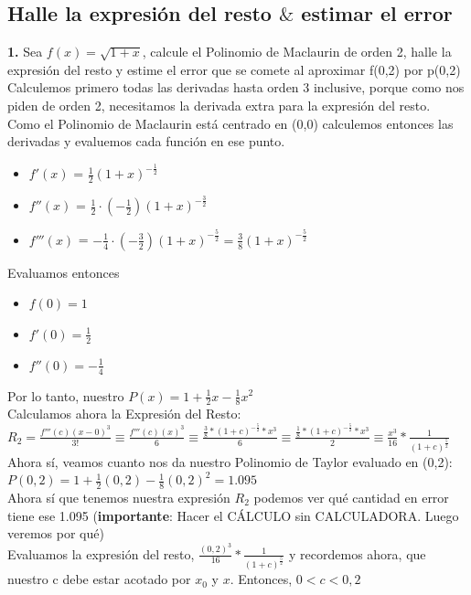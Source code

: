 \documentclass[10pt,a4paper]{article}
\begin{document}
\subsection*{Halle la expresión del resto $\&$ estimar el error}
\label{subsec:error_polinomio_taylor_2}
\textbf{1.} Sea $f(x) = \sqrt{1+x}$, calcule el Polinomio de Maclaurin de orden 2, halle la expresión del resto y estime el error que se comete al aproximar f(0,2) por p(0,2) \\
Calculemos primero todas las derivadas hasta orden 3 inclusive, porque como nos piden de orden 2, necesitamos la derivada extra para la expresión del resto. \\
Como el Polinomio de Maclaurin está centrado en (0,0) calculemos entonces las derivadas y evaluemos cada función en ese punto.
\begin{itemize}
    \item $f'(x)$ = $\frac{1}{2}(1+x)^{-\frac{1}{2}}$
    \item $f''(x)$ = $\frac{1}{2} \cdot \left(-\frac{1}{2}\right)(1+x)^{-\frac{3}{2}}$
    \item $f'''(x)$ = $-\frac{1}{4} \cdot \left(-\frac{3}{2}\right)(1+x)^{-\frac{5}{2}} = \frac{3}{8}(1+x)^{-\frac{5}{2}}$ 
\end{itemize}
Evaluamos entonces 
\begin{itemize}
    \item $f(0) = 1$
    \item $f'(0) = \frac{1}{2}$
    \item $f''(0) = -\frac{1}{4}$
\end{itemize}
Por lo tanto, nuestro $P(x) = 1 + \frac{1}{2}x - \frac{1}{8}x^{2}$ \\
Calculamos ahora la Expresión del Resto: $R_{2} = \frac{f'''(c)(x-0)^{3}}{3!} \equiv \frac{f'''(c)(x)^{3}}{6} \equiv  \frac{\frac{3}{8}*(1+c)^{-\frac{5}{2}}*x^{3}}{6} \equiv \frac{\frac{1}{8}*(1+c)^{-\frac{5}{2}}*x^{3}}{2} \equiv \frac{x^{3}}{16} * \frac{1}{(1+c)^{\frac{5}{2}}}$ \\
Ahora sí, veamos cuanto nos da nuestro Polinomio de Taylor evaluado en (0,2): $P(0,2) = 1 + \frac{1}{2}(0,2) - \frac{1}{8}(0,2)^{2} = 1.095$ \\
Ahora sí que tenemos nuestra expresión $R_{2}$ podemos ver qué cantidad en error tiene ese 1.095 (\textbf{importante}: Hacer el CÁLCULO sin CALCULADORA. Luego veremos por qué) \\
Evaluamos la expresión del resto, $\frac{(0,2)^{3}}{16} * \frac{1}{(1+c)^{\frac{5}{2}}}$ y recordemos ahora, que nuestro c debe estar acotado por $x_{0}$ y $x$. Entonces, $0 < c < 0,2$  \\
\end{document}

